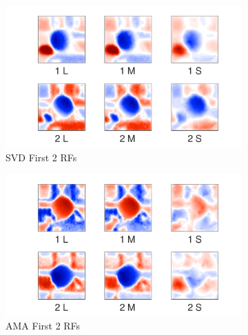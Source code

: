 \documentclass{jov}
\begin{document}
\begin{figure}
\centering
\begin{subfigure}[b]{0.27 \textwidth}
		\centering
        \includegraphics[width=\textwidth]{../Figures/Figure13/Figure13_a.pdf}
        \caption{SVD First 2 RFs}
        \label{fig:case12SVD}
    \end{subfigure}
    \begin{subfigure}[b]{0.27 \textwidth}   
        \includegraphics[width=\textwidth]{../Figures/Figure13/Figure13_b.pdf}
        \caption{AMA First 2 RFs}
        \label{fig:case12AMA}
    \end{subfigure}
        \begin{subfigure}[b]{0.20 \textwidth}

\end{subfigure}
\end{figure}
\end{document}
